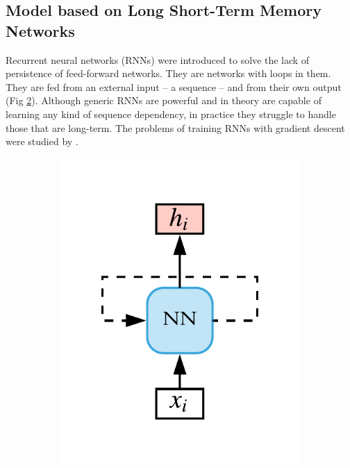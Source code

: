 \subsection{Model based on Long Short-Term Memory Networks}

Recurrent neural networks (RNNs) were introduced to solve the lack of persistence of feed-forward networks. They are networks with loops in them. They are fed from an external input -- a sequence -- and from their own output (Fig \ref{fig:rnn:generic}). Although generic RNNs are powerful and in theory are capable of learning any kind of sequence dependency, in practice they struggle to handle those that are long-term. The problems of training RNNs with gradient descent were studied by .

\begin{figure}[ht]
	\centering
	\begin{subfigure}[t]{0.25\textwidth}
		\includegraphics[width=\linewidth]{imgs/rnn.pdf}
		\label{fig:rnn:generic}
	\end{subfigure}%

\end{figure}
